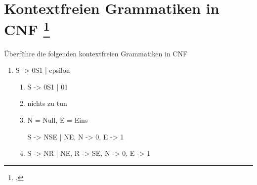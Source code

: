 \documentclass{lehramt-informatik-aufgabe}
\begin{document}
\let\schrittE=\liChomskySchrittUeberschriftErklaerung

\section{Kontextfreien Grammatiken in CNF
\footcite[Seite 37]{theo:fs:2}}

Überführe die folgenden kontextfreien Grammatiken in CNF

\begin{enumerate}


\item

\begin{liProduktionsRegeln}
S -> 0S1 | epsilon
\end{liProduktionsRegeln}

\begin{liAntwort}
\begin{enumerate}
\item \schrittE{1}

\begin{liProduktionsRegeln}
S -> 0S1 | 01
\end{liProduktionsRegeln}
\item \schrittE{2}

nichts zu tun

\item \schrittE{3}

N = Null, E = Eins

\begin{liProduktionsRegeln}
S -> NSE | NE,
N -> 0,
E -> 1
\end{liProduktionsRegeln}

\item \schrittE{4}

\begin{liProduktionsRegeln}
S -> NR | NE,
R -> SE,
N -> 0,
E -> 1
\end{liProduktionsRegeln}
\end{enumerate}
\end{liAntwort}



\end{enumerate}
\end{document}
